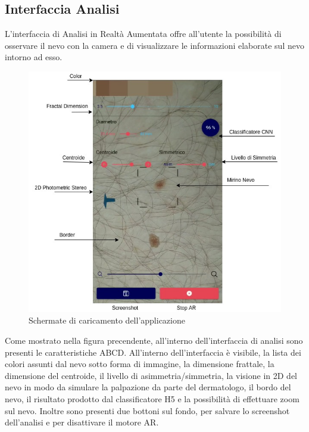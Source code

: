 {\newpage
\subsection{Interfaccia Analisi}
L'interfaccia di Analisi in Realtà Aumentata offre all'utente la possibilità di osservare il nevo con la camera e di visualizzare le informazioni elaborate sul nevo intorno ad esso.
\begin{figure}[h]
	\begin{center}
			\includegraphics[scale=0.7]{figure/capitolo5/ui.jpg}
	\end{center}
	\caption{Schermate di caricamento dell'applicazione}	
\end{figure}
\newpage
Come mostrato nella figura precendente, all'interno dell'interfaccia di analisi sono presenti le caratteristiche ABCD.
All'interno dell'interfaccia è visibile, la lista dei colori assunti dal nevo sotto forma di immagine, la dimensione frattale, la dimensione del centroide, il livello di asimmetria/simmetria, la visione in 2D del nevo in modo da simulare la palpazione da parte del dermatologo, il bordo del nevo, il risultato prodotto dal classificatore H5 e la possibilità di effettuare zoom sul nevo.
Inoltre sono presenti due bottoni sul fondo, per salvare lo screenshot dell'analisi e per disattivare il motore AR.
}
